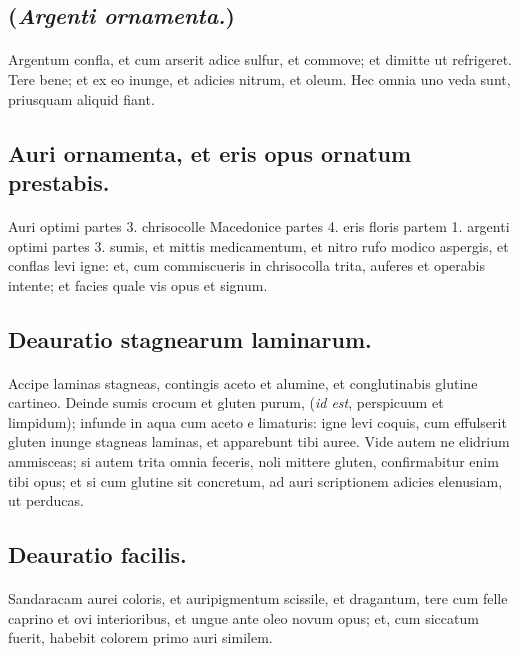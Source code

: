 \documentclass[a4paper, 11pt, oneside, polutonikogreek, italian]{article}
\begin{document}
\subsection{(\emph{Argenti ornamenta.})}
\paragraph{}
Argentum confla, et cum arserit adice sulfur, et commove; et dimitte ut refrigeret. Tere bene; et ex eo inunge, et adicies nitrum, et oleum. Hec omnia uno veda sunt, priusquam aliquid fiant.

\subsection{Auri ornamenta, et eris opus ornatum prestabis.}
\paragraph{}
Auri optimi partes 3. chrisocolle Macedonice partes 4. eris floris partem 1. argenti optimi partes 3. sumis, et mittis medicamentum, et nitro rufo modico aspergis, et conflas levi igne: et, cum commiscueris in chrisocolla trita, auferes et operabis intente; et facies quale vis opus et signum.

\subsection{Deauratio stagnearum laminarum.}
\paragraph{}
Accipe laminas stagneas, contingis aceto et alumine, et conglutinabis glutine cartineo. Deinde sumis crocum et gluten purum, (\emph{id est}, perspicuum et limpidum); infunde in aqua cum aceto e limaturis: igne levi coquis, cum effulserit gluten inunge stagneas laminas, et apparebunt tibi auree. Vide autem ne elidrium ammisceas; si autem trita omnia feceris, noli mittere gluten, confirmabitur enim tibi opus; et si cum glutine sit concretum, ad auri scriptionem adicies elenusiam, ut perducas.

\subsection{Deauratio facilis.}
\paragraph{}
Sandaracam aurei coloris, et auripigmentum scissile, et dragantum, tere cum felle caprino et ovi interioribus, et ungue ante oleo novum opus; et, cum siccatum fuerit, habebit colorem primo auri similem.
\end{document}
